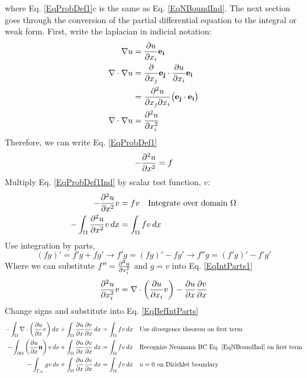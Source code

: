 \documentclass[12pt,3p]{article}
\begin{document}
where Eq. \ref{EqProbDef1}c is the same as Eq. \ref{EqNBoundInd}.
The next section goes through the conversion of the partial differential equation to the integral or weak form. First, write the laplacian in indicial notation: 
\begin{align*}
\nabla u 
	&= \pdv{u}{x_i} \mathbf{e_i} \\
\nabla \cdot \nabla u 
	&= \pdv{}{x_j} \mathbf{e_j} \cdot \pdv{u}{x_i} \mathbf{e_i} \\
	&= \pdv{u}{x_j}{x_i} \big( \mathbf{e_j} \cdot \mathbf{e_i} \big) \\
\nabla \cdot \nabla u 
	&= \pdv[2]{u}{x_i} 
\end{align*}
Therefore, we can write Eq. \ref{EqProbDef1}
\begin{equation}\label{EqProbDef1Ind}
- \pdv[2]{u}{x}  = f
\end{equation}
Multiply Eq. \ref{EqProbDef1Ind} by scalar test function, $v$: 
\begin{align}\label{EqBefIntParts}
\begin{split}
- \pdv[2]{u}{x} v 
	&= f v \quad \text{Integrate over domain } \Omega\\
- \int_{\Omega} \pdv[2]{u}{x} v \,d {x} 
	&= \int_{\Omega} f v \, d {x} 
\end{split}
\end{align}
Use integration by parts,
\begin{equation}\label{EqIntParts1}
(fg)' = f'g + fg' \rightarrow f'g = (fg)' - fg' \rightarrow f''g = (f'g)' - f'g'
\end{equation}
Where we can substitute $f'' = \pdv[2]{u}{x_i} $ and $g = v$ into Eq. \ref{EqIntParts1}
\begin{equation*}
\pdv[2]{u}{x_i} v = \nabla \cdot \bigg( \pdv{u}{x_i} v \bigg) - \pdv{u}{x} \pdv{v}{x}
\end{equation*}
Change signs and substitute into Eq. \ref{EqBefIntParts}
\begin{align*}
- \int_{\Omega} \nabla \cdot \bigg( \pdv{u}{x} v \bigg) \, d{x} 
+ \int_{\Omega} \pdv{u}{x} \pdv{v}{x} \, d {x} 
	&= \int_{\Omega} f v  \, d{x} \quad \text{Use divergence theorem on first term}\\
- \int_{\partial \Omega}  \bigg( \pdv{u}{x} \mathbf{n} \bigg)  \, v  \, d{s} 
+ \int_{\Omega} \pdv{u}{x} \pdv{v}{x} \, d {x} 
	&= \int_{\Omega} f v \, d{x} \quad \text{Recognize Neumann BC Eq. \ref{EqNBoundInd} on first term} \\
- \int_{\Gamma_N}  g v \, d{s}  
+ \int_{\Omega} \pdv{u}{x} \pdv{v}{x} \, d{x}  
	&= \int_{\Omega} f v \, d{x}  \quad \text{$u = 0$ on Dirichlet boundary} 
\end{align*}
\end{document}
